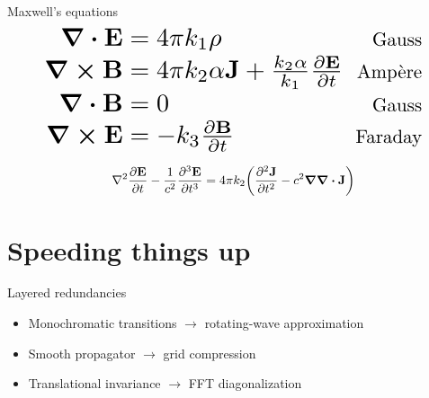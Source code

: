 \documentclass[aspectratio=169]{beamer}
\begin{document}
\begin{frame}{Maxwell's equations}
  \begin{align*}
    \scalebox{2}{$\div \vb{E}$} & \scalebox{2}{$\; = 4 \pi k_1 \rho$} &  \scalebox{1.5}{\text{Gauss}}\\
    \scalebox{2}{$\curl \vb{B}$} & \scalebox{2}{$\; = 4 \pi k_2 \alpha \vb{J} + \frac{k_2 \alpha}{k_1} \pdv{\vb{E}}{t}$} & \scalebox{1.5}{\text{Amp\`ere}} \\
    \scalebox{2}{$\div \vb{B}$} & \scalebox{2}{$\; = 0$} & \scalebox{1.5}{\text{Gauss}} \\
    \scalebox{2}{$\curl \vb{E}$} & \scalebox{2}{$\; = -k_3 \pdv{\vb{B}}{t}$} & \scalebox{1.5}{\text{Faraday}} \\
  \end{align*}
\end{frame}

\begin{frame}
  \begin{equation*}
    \laplacian{\pdv{\vb{E}}{t}} - \frac{1}{c^2} \pdv[3]{\vb{E}}{t} = 4 \pi k_2 \qty(\pdv[2]{\vb{J}}{t} - c^2 \grad \div \vb{J})
  \end{equation*}
\end{frame}

\section{Speeding things up}

\begin{frame}{Layered redundancies}
  \begin{itemize}
    \item Monochromatic transitions $\rightarrow$ \alert{rotating-wave approximation}
    \item Smooth propagator $\rightarrow$ \alert{grid compression}
    \item Translational invariance $\rightarrow$ \alert{FFT diagonalization}
  \end{itemize}
\end{frame}
\end{document}
